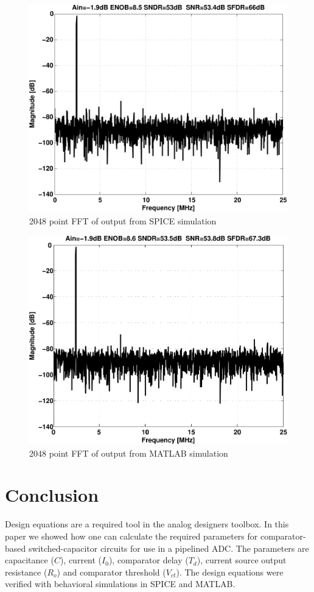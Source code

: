 \begin{figure}[htbp]
\centerline{ \includegraphics[width=\myfigwidth]{graphics/spicefft}}
  \caption{2048 point FFT of output from SPICE simulation}
  \label{cdesfig:spice}
\end{figure}

\begin{figure}[htbp]
\centerline{ \includegraphics[width=\myfigwidth]{graphics/matlabfft}}
  \caption{2048 point FFT of output from MATLAB simulation}
  \label{cdesfig:matlab}
\end{figure}

\section{Conclusion}
Design equations are a required tool in the analog designers
toolbox. In this paper we showed how one can calculate the required
parameters for 
comparator-based switched-capacitor circuits for use in a pipelined ADC. The parameters are
capacitance ($C$), current ($I_0$), comparator delay ($T_d$), current
source output resistance ($R_o$) and comparator threshold
($V_{ct}$). The design equations
were verified with behavioral simulations in SPICE and MATLAB.




